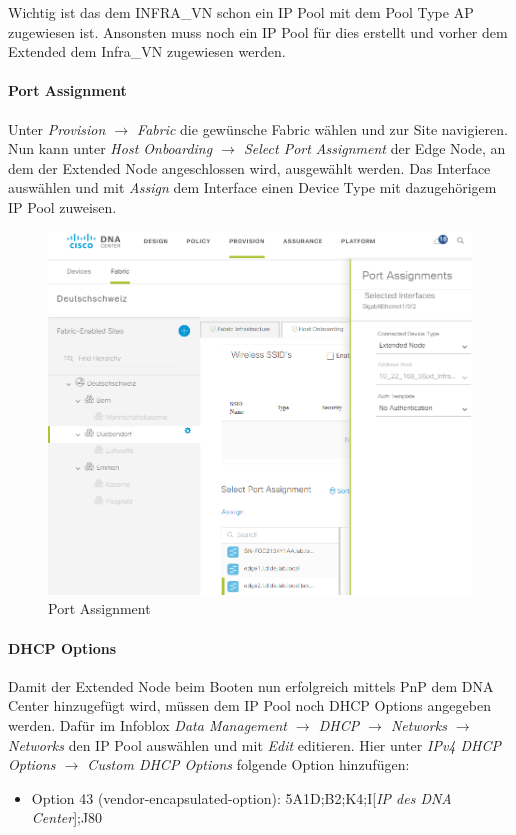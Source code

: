 Wichtig ist das dem INFRA\_VN schon ein IP Pool mit dem Pool Type AP zugewiesen ist. Ansonsten muss noch ein IP Pool für dies erstellt und vorher dem Extended dem Infra\_VN zugewiesen werden.

\paragraph{Port Assignment}
Unter \textit{Provision $\rightarrow$ Fabric} die gewünsche Fabric wählen und zur Site navigieren. Nun kann unter \textit{Host Onboarding $\rightarrow$ Select Port Assignment} der Edge Node, an dem der Extended Node angeschlossen wird, ausgewählt werden. Das Interface auswählen und mit \textit{Assign} dem Interface einen Device Type mit dazugehörigem IP Pool zuweisen.

\begin{figure}[H]
	\centering
	\includegraphics[width=1\linewidth]{img/Absicherung/ExtendedNode3}
	\caption{Port Assignment}
	\label{fig:Port Assignment}
\end{figure}

\paragraph{DHCP Options}
Damit der Extended Node beim Booten nun erfolgreich mittels PnP dem DNA Center hinzugefügt wird, müssen dem IP Pool noch DHCP Options angegeben werden. Dafür im Infoblox \textit{Data Management $\rightarrow$ DHCP $\rightarrow$ Networks $\rightarrow$ Networks} den IP Pool auswählen und mit \textit{Edit} editieren. Hier unter \textit{IPv4 DHCP Options $\rightarrow$ Custom DHCP Options} folgende Option hinzufügen:
\begin{itemize}
	\item Option 43 (vendor-encapsulated-option): 5A1D;B2;K4;I[\textit{IP des DNA Center}];J80
\end{itemize}


